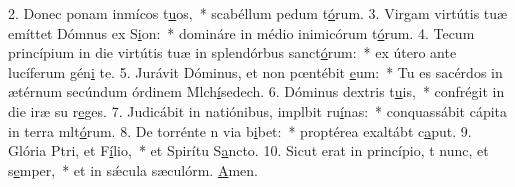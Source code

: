 2. Donec ponam inmícos t\uline{u}os,~* scabéllum pedum t\uline{ó}rum.
3. Virgam virtútis tuæ emíttet Dómnus ex S\uline{i}on:~* domináre in médio inimicórum t\uline{ó}rum.
4. Tecum princípium in die virtútis tuæ in splendórbus sanct\uline{ó}rum:~* ex útero ante lucíferum gén\uline{i} te.
5. Jurávit Dóminus, et non pœntébit \uline{e}um:~* Tu es sacérdos in ætérnum secúndum órdinem Mlch\uline{í}sedech.
6. Dóminus  dextris t\uline{u}is,~* confrégit in die iræ su r\uline{e}ges.
7. Judicábit in natiónibus, implbit ru\uline{í}nas:~* conquassábit cápita in terra mlt\uline{ó}rum.
8. De torrénte n via b\uline{i}bet:~* proptérea exaltábt c\uline{a}put.
9. Glória Ptri, et F\uline{í}lio,~* et Spirítu S\uline{a}ncto.
10. Sicut erat in princípio, t nunc, et s\uline{e}mper,~* et in sǽcula sæculórm. \uline{A}men.

